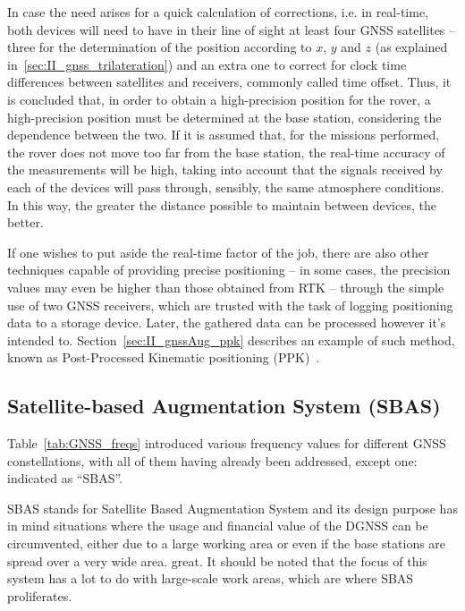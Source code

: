 In case the need arises for a quick calculation of corrections, i.e. in real-time, both devices will need to have in their line of sight at least four GNSS satellites -- three for the determination of the position according to $x$, $y$ and $z$ (as explained in~\ref{sec:II_gnss_trilateration}) and an extra one to correct for clock time differences between satellites and receivers, commonly called time offset. Thus, it is concluded that, in order to obtain a high-precision position for the rover, a high-precision position must be determined at the base station, considering the dependence between the two. If it is assumed that, for the missions performed, the rover does not move too far from the base station, the real-time accuracy of the measurements will be high, taking into account that the signals received by each of the devices will pass through, sensibly, the same atmosphere conditions. In this way, the greater the distance possible to maintain between devices, the better.

If one wishes to put aside the real-time factor of the job, there are also other techniques capable of providing precise positioning -- in some cases, the precision values may even be higher than those obtained from RTK -- through the simple use of two GNSS receivers, which are trusted with the task of logging positioning data to a storage device. Later, the gathered data can be processed however it's intended to. Section~\ref{sec:II_gnssAug_ppk} describes an example of such method, known as Post-Processed Kinematic positioning (PPK)~\cite{novatel_gnss,kaplan_2017,groves_2008}.

\subsection{Satellite-based Augmentation System (SBAS)}\label{sec:II_gnssAug_sbas}

Table~\ref{tab:GNSS_freqs} introduced various frequency values for different GNSS constellations, with all of them having already been addressed, except one: indicated as ``SBAS''.

SBAS stands for Satellite Based Augmentation System and its design purpose has in mind situations where the usage and financial value of the DGNSS can be circumvented, either due to a large working area or even if the base stations are spread over a very wide area. great. It should be noted that the focus of this system has a lot to do with large-scale work areas, which are where SBAS proliferates.

